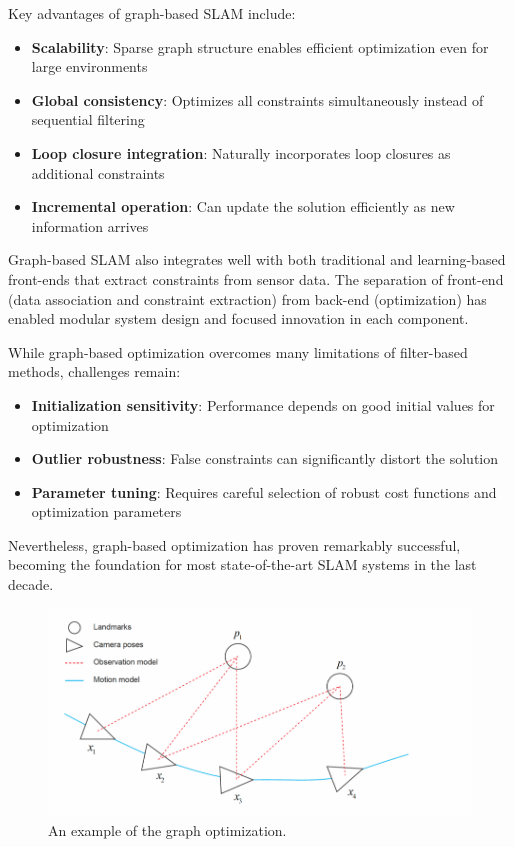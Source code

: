 \documentclass[12pt]{article}
\begin{document}
    Key advantages of graph-based SLAM include:
    \begin{itemize}
        \item \textbf{Scalability}: Sparse graph structure enables efficient optimization even for large environments
        \item \textbf{Global consistency}: Optimizes all constraints simultaneously instead of sequential filtering
        \item \textbf{Loop closure integration}: Naturally incorporates loop closures as additional constraints
        \item \textbf{Incremental operation}: Can update the solution efficiently as new information arrives
    \end{itemize}
    
    Graph-based SLAM also integrates well with both traditional and learning-based front-ends that extract constraints from sensor data. 
    The separation of front-end (data association and constraint extraction) from back-end (optimization) has enabled modular system design and focused innovation in each component.
    
    \newpage
    While graph-based optimization overcomes many limitations of filter-based methods, challenges remain:
    \begin{itemize}
        \item \textbf{Initialization sensitivity}: Performance depends on good initial values for optimization
        \item \textbf{Outlier robustness}: False constraints can significantly distort the solution
        \item \textbf{Parameter tuning}: Requires careful selection of robust cost functions and optimization parameters
    \end{itemize}
    
    Nevertheless, graph-based optimization has proven remarkably successful, becoming the foundation for most state-of-the-art SLAM systems in the last decade.
    
    \begin{figure}[h!]
        \centering
        \includegraphics[width=1.1\textwidth]{graph_based_optimization.png}
        \caption{An example of the graph optimization. \cite{graph_optimization_img}}
        \label{fig:graph_based_optimization}
    \end{figure}
\end{document}
